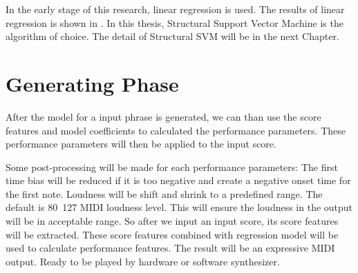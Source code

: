    In the early stage of this research, linear regression is used. The results of linear regression is shown in \cite{TODO:wocmat}. In this thesis, Structural Support Vector Machine\cite{TODO:svm-hmm} is the algorithm of choice. The detail of Structural SVM will be in the next Chapter.
   \section{Generating Phase}
      After the model for a input phrase is generated, we can than use the score features and model coefficients to calculated the performance parameters. These performance parameters will then be applied to the input score.
      
      Some post-processing will be made for each performance parameters: The first time bias will be reduced if it is too negative and create a negative onset time for the first note. Loudness will be shift and shrink to a predefined range. The default is 80~127 MIDI loudness level. This will ensure the loudness in the output will be in acceptable range. 
 So after we input an input score, its score features will be extracted. These score features combined with regression model will be used to calculate performance features. The result will be an expressive MIDI output. Ready to be played by hardware or software synthesizer.  
   
